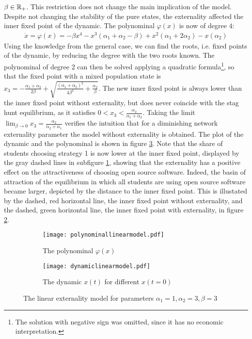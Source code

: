 $\beta \in \mathbb{R}_+$. This restriction does not change the main implication
of the model. 
Despite not changing the stability of the pure states, 
the externality affected the inner fixed point of the dynamic.
The polynominal $\varphi(x)$ is now of degree $4$:
\begin{align}
        \dot{x} = \varphi(x) = -\beta x^4 -x^3(\alpha_1 + \alpha_2 
        - \beta ) + x^2 (\alpha_1 + 2 \alpha_2) - x(\alpha_2)
\end{align}
Using the knowledge from the general case, we can find the roots, i.e. fixed
points of the dynamic, by reducing the degree with the two roots known. The
polynominal of degree $2$ can then be solved applying a quadratic formula\footnote{
The solution with negative sign was omitted, since it has no economic 
interpretation.}, so that the fixed point with a mixed population state is
$x_3 = -\frac{\alpha_1+\alpha_2}{2 \beta} + 
\sqrt{\frac{(\alpha_1+\alpha_2)^2}{4\beta^2} +\frac{\alpha_2}{\beta}}$. 
The new inner fixed point is always lower than the inner fixed point without 
externality, but does never coincide with the stag hunt equilibrium, as it 
satisfies $0<x_3<\frac{\alpha_2}{\alpha_1+\alpha_2}$. 
Taking the limit $\lim_{\beta \rightarrow 0} x_3 = 
\frac{\alpha_2}{\alpha_2+\alpha_1}$ verifies the intuition that for a 
diminishing network externality parameter the model without 
externality is obtained.
The plot of the dynamic and the polynominal is 
shown in figure \ref{fig:plotmodellinear}.
Note that the share of students choosing strategy 1 is now lower at the 
inner fixed point, displayed by the gray dashed lines in subfigure 
\ref{fig:externalitypolynominal}, showing that the externality has a positive 
effect on the attractiveness of choosing open source software. 
Indeed, the basin of attraction of the equilibrium in which all 
students are using open source software became larger, 
depicted by the distance to the inner fixed point.
This is illustated by the dashed, red horizontal line, 
the inner fixed point without externality, and the dashed, green horizontal 
line, the inner fixed point with externality, 
in figure \ref{fig:dynamiclinear}.
\begin{figure}[h]
        \centering
        \begin{subfigure}{.5\textwidth}
        \centering
        \texttt{[image: polynominallinearmodel.pdf]}
        \caption[Polynominal of the externality model]{The polynominal $\varphi(x)$} 
        \label{fig:externalitypolynominal}
        \end{subfigure}%
        \begin{subfigure}{.5\textwidth}
        \centering
        \texttt{[image: dynamiclinearmodel.pdf]}
        \caption[Replicator dynamic of the model with externality]{The dynamic $x(t)$ for different $x(t=0)$} 
        \label{fig:dynamiclinear}
        \end{subfigure}%
        \caption[Polynominal and Dynamic of the model with externality]
        {The linear externality 
                model for parameters $\alpha_1=1,\alpha_2=3,\beta=3$}
        \label{fig:plotmodellinear}
\end{figure}
